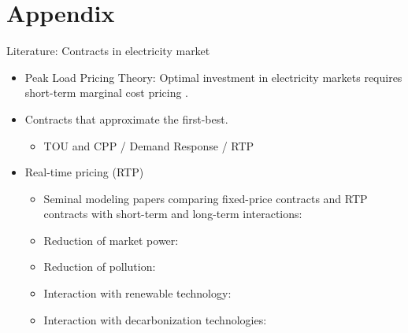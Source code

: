 \documentclass{class}
\begin{document}

\section{Appendix}

\appendix


\begin{frame}{Literature: Contracts in electricity market}\label{Lit_FB}

\begin{itemize}
    \item Peak Load Pricing Theory: Optimal investment in electricity markets requires short-term marginal cost pricing \cite{m1949tarification,joskow2007reliability}. \vfill

\item Contracts that approximate the first-best.
    \begin{itemize}
        \item  TOU and CPP / Demand Response / RTP \cite{Hinchberger2024}
    \end{itemize}

    \vfill

\item Real-time pricing (RTP)
    \begin{itemize}
        \item Seminal modeling papers comparing fixed-price contracts and RTP contracts with short-term and long-term interactions: \cite{Borenstein2003,Borenstein2005a,Borenstein2005b}
        \item Reduction of market power: \cite{Poletti2020}
        \item Reduction of pollution: \cite{Borenstein2021} 
        \item Interaction with renewable technology: \cite{Imelda2024}
        \item Interaction with decarbonization technologies: \cite{bailey2024electric}
    \end{itemize}
\end{itemize}

    \vfill
    
 \hyperlink{Motivations}{}
    
\end{frame}
\end{document}
